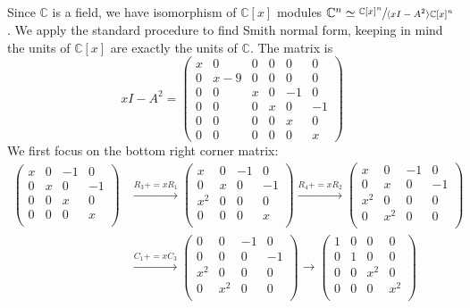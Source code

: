 \documentclass{article}
\begin{document}
\subsection{}
Since $\mathbb{C}$ is a field, we have isomorphism of $\mathbb{C}[x]$ modules $\mathbb{C}^n \simeq \sfrac{\mathbb{C}[x]^n}{\langle xI - A^2 \rangle \mathbb{C}[x]^n}$. We apply the standard procedure to find Smith normal form, keeping in mind the units of $\mathbb{C}[x]$ are exactly the units of $\mathbb{C}$. The matrix is
$$xI - A^2 = \begin{pmatrix}
x & 0 & 0 & 0 & 0 & 0 \\ 0 & x - 9 & 0 & 0 & 0 & 0 \\ 0 & 0 & x & 0 & -1 & 0 \\ 0 & 0 & 0 & x & 0 & -1 \\ 0 & 0 & 0 & 0 & x & 0 \\ 0 & 0 & 0 & 0 & 0 & x
\end{pmatrix}$$
We first focus on the bottom right corner matrix:
\begin{equation*}
\begin{split}
\begin{pmatrix}
x & 0 & -1 & 0\\
0 & x & 0 & -1\\
0 & 0 & x & 0 \\
0 & 0 & 0 & x \\
\end{pmatrix}
&\xrightarrow[]{R_3 += xR_1}
\begin{pmatrix}
x & 0 & -1 & 0\\
0 & x & 0 & -1\\
x^2 & 0 & 0 & 0 \\
0 & 0 & 0 & x \\
\end{pmatrix}
\xrightarrow[]{R_4 += xR_2}
\begin{pmatrix}
x & 0 & -1 & 0\\
0 & x & 0 & -1\\
x^2 & 0 & 0 & 0 \\
0 & x^2 & 0 & 0 \\
\end{pmatrix}\\
&\xrightarrow[]{C_1 += xC_3}
\begin{pmatrix}
0 & 0 & -1 & 0\\
0 & 0 & 0 & -1\\
x^2 & 0 & 0 & 0 \\
0 & x^2 & 0 & 0 \\
\end{pmatrix}
\rightarrow
\begin{pmatrix}
1 & 0 & 0 & 0\\
0 & 1 & 0 & 0\\
0 & 0 & x^2 & 0 \\
0 & 0 & 0 & x^2 \\
\end{pmatrix}
\end{split}
\end{equation*}
\end{document}
